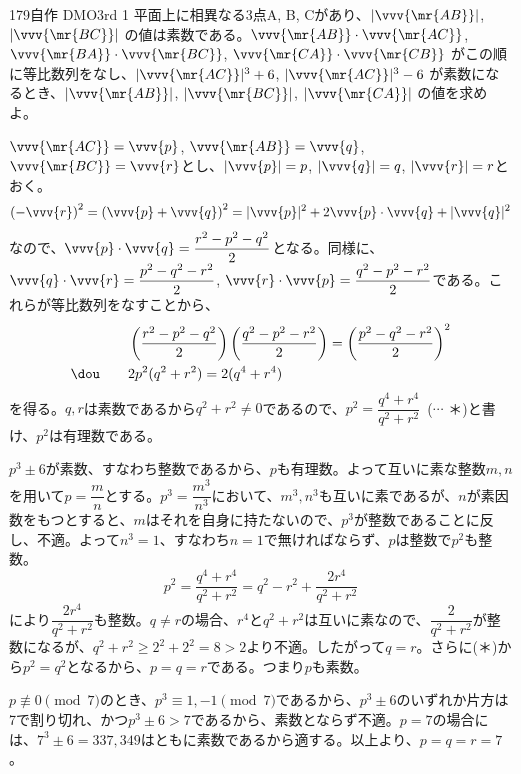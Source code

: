 \begin{prob}{179}{}{自作 DMO3rd 1}
 平面上に相異なる3点A, B, Cがあり、$|\vvv{\mr{AB}}|$, $|\vvv{\mr{BC}}|$ の値は素数である。$\vvv{\mr{AB}}\cdot\vvv{\mr{AC}}$, $\vvv{\mr{BA}}\cdot\vvv{\mr{BC}}$, $\vvv{\mr{CA}}\cdot\vvv{\mr{CB}}$ がこの順に等比数列をなし、$|\vvv{\mr{AC}}|^3+6$, $|\vvv{\mr{AC}}|^3-6$ が素数になるとき、$|\vvv{\mr{AB}}|$, $|\vvv{\mr{BC}}|$, $|\vvv{\mr{CA}}|$ の値を求めよ。
\end{prob}
$\vvv{\mr{AC}}=\vvv{p}$, $\vvv{\mr{AB}}=\vvv{q}$, $\vvv{\mr{BC}}=\vvv{r}$とし、$|\vvv{p}|=p$, $|\vvv{q}|=q$, $|\vvv{r}|=r$とおく。
\[ \left(-\vvv{r}\right)^2=\left(\vvv{p}+\vvv{q}\right)^2=|\vvv{p}|^2+2\vvv{p}\cdot\vvv{q}+|\vvv{q}|^2 \]
なので、$\vvv{p}\cdot\vvv{q}=\dfrac{r^2-p^2-q^2}{2}$となる。同様に、$\vvv{q}\cdot\vvv{r}=\dfrac{p^2-q^2-r^2}{2}$, $\vvv{r}\cdot\vvv{p}=\dfrac{q^2-p^2-r^2}{2}$である。これらが等比数列をなすことから、
\begin{align*}
 & \left(\frac{r^2-p^2-q^2}{2}\right) \left(\frac{q^2-p^2-r^2}{2}\right)=\left(\frac{p^2-q^2-r^2}{2}\right)^2 \\
 \dou \qquad &2p^2(q^2+r^2)=2(q^4+r^4)
\end{align*}
を得る。$q, r$は素数であるから$q^2+r^2\neq 0$であるので、$p^2=\dfrac{q^4+r^4}{q^2+r^2}$~($\cdots$ ＊)と書け、$p^2$は有理数である。

$p^3\pm 6$が素数、すなわち整数であるから、$p$も有理数。よって互いに素な整数$m, n$を用いて$p=\dfrac{m}{n}$とする。$p^3=\dfrac{m^3}{n^3}$において、$m^3, n^3$も互いに素であるが、$n$が素因数をもつとすると、$m$はそれを自身に持たないので、$p^3$が整数であることに反し、不適。よって$n^3=1$、すなわち$n=1$で無ければならず、$p$は整数で$p^2$も整数。
\[ p^2=\frac{q^4+r^4}{q^2+r^2}=q^2-r^2+\frac{2r^4}{q^2+r^2} \]
により$\dfrac{2r^4}{q^2+r^2}$も整数。$q\neq r$の場合、$r^4$と$q^2+r^2$は互いに素なので、$\dfrac{2}{q^2+r^2}$が整数になるが、$q^2+r^2\ge 2^2+2^2=8>2$より不適。したがって$q=r$。さらに(＊)から$p^2=q^2$となるから、$p=q=r$である。つまり$p$も素数。

$p \not\equiv 0 \pmod{7}$のとき、$p^3\equiv 1, -1 \pmod{7}$であるから、$p^3\pm 6$のいずれか片方は7で割り切れ、かつ$p^3\pm 6 >7$であるから、素数とならず不適。$p=7$の場合には、$7^3\pm6=337, 349$はともに素数であるから適する。以上より、$p=q=r=7$。